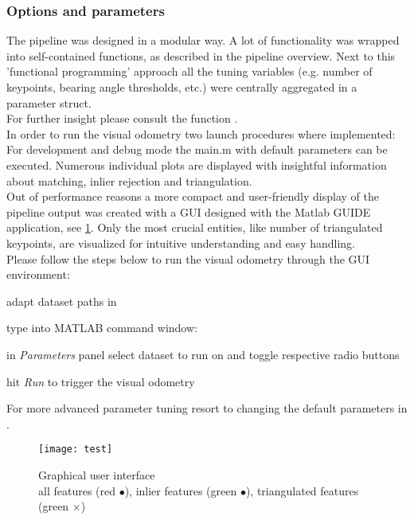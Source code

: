 %

\subsubsection{Options and parameters}
The pipeline was designed in a modular way. A lot of functionality was wrapped into self-contained functions, as described in the pipeline overview. Next to this 'functional programming' approach all the tuning variables (e.g. number of keypoints, bearing angle thresholds, etc.) were centrally aggregated in a parameter struct.\\
For further insight please consult the function .\\

In order to run the visual odometry two launch procedures where implemented: For development and debug mode the main.m with default parameters can be executed. Numerous individual plots are displayed with insightful information about matching, inlier rejection and triangulation.\\

Out of performance reasons a more compact and user-friendly display of the pipeline output was created with a GUI designed with the Matlab GUIDE application, see \cref{img_gui}. Only the most crucial entities, like number of triangulated keypoints, are visualized for intuitive understanding and easy handling.\\
Please follow the steps below to run the visual odometry through the GUI environment:
\begin{compactenum}
	\item adapt dataset paths in 
	\item type into MATLAB command window: 
	\item in \textit{Parameters} panel select dataset to run on and toggle respective radio buttons
	\item hit \textit{Run} to trigger the visual odometry\\
\end{compactenum}

For more advanced parameter tuning resort to changing the default parameters in .

\begin{figure}[ht]
	\centering
	\texttt{[image: test]}
	\captionsetup{justification=centering}
	\caption{Graphical user interface \\all features (red $\bullet$), inlier features (green $\bullet$), triangulated features (green $\times$)}
	\label{img_gui}
\end{figure}


\clearpage{\pagestyle{plain}\cleardoublepage}

\clearpage{\pagestyle{plain}\cleardoublepage}
